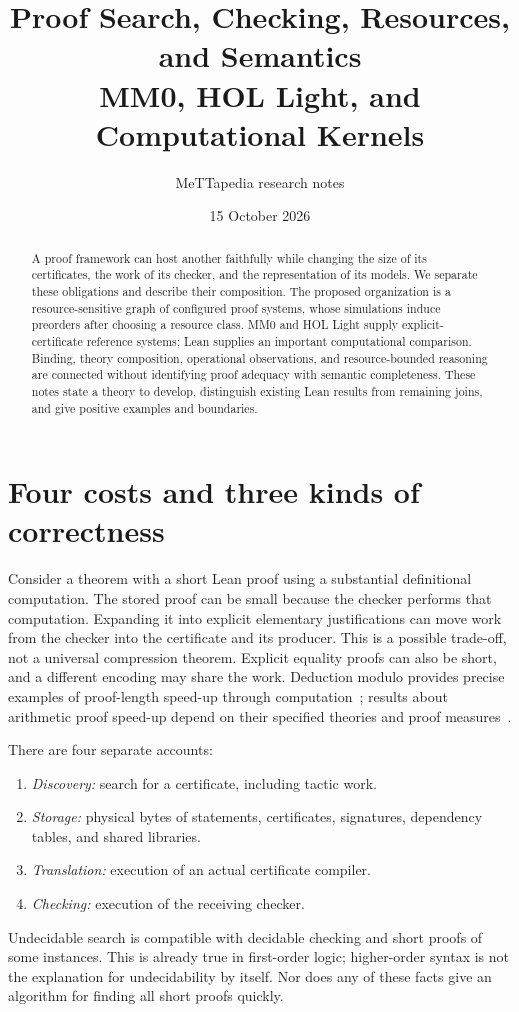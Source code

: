 \documentclass[11pt]{article}
\title{Proof Search, Checking, Resources, and Semantics\\
  MM0, HOL Light, and Computational Kernels}
\author{MeTTapedia research notes}
\date{15 October 2026}
\begin{document}
\maketitle
\begin{abstract}
A proof framework can host another faithfully while changing the size of its
certificates, the work of its checker, and the representation of its models.
We separate these obligations and describe their composition. The proposed
organization is a resource-sensitive graph of configured proof systems,
whose simulations induce preorders after choosing a resource class. MM0
and HOL Light supply explicit-certificate reference systems; Lean supplies
an important computational comparison. Binding, theory composition,
operational observations, and resource-bounded reasoning are connected
without identifying proof adequacy with semantic completeness. These notes
state a theory to develop, distinguish existing Lean results from remaining
joins, and give positive examples and boundaries.
\end{abstract}

\section{Four costs and three kinds of correctness}
Consider a theorem with a short Lean proof using a substantial definitional
computation. The stored proof can be small because the checker performs that
computation. Expanding it into explicit elementary justifications can move
work from the checker into the certificate and its producer. This is a
possible trade-off, not a universal compression theorem. Explicit equality
proofs can also be short, and a different encoding may share the work.
Deduction modulo provides precise examples of proof-length speed-up
through computation~\cite{burel}; results about arithmetic proof speed-up
depend on their specified theories and proof measures~\cite{buss}.

There are four separate accounts:
\begin{enumerate}
\item \emph{Discovery:} search for a certificate, including tactic work.
\item \emph{Storage:} physical bytes of statements, certificates, signatures,
  dependency tables, and shared libraries.
\item \emph{Translation:} execution of an actual certificate compiler.
\item \emph{Checking:} execution of the receiving checker.
\end{enumerate}
Undecidable search is compatible with decidable checking and short proofs
of some instances. This is already true in first-order logic; higher-order
syntax is not the explanation for undecidability by itself. Nor does any
of these facts give an algorithm for finding all short proofs quickly.
\end{document}
